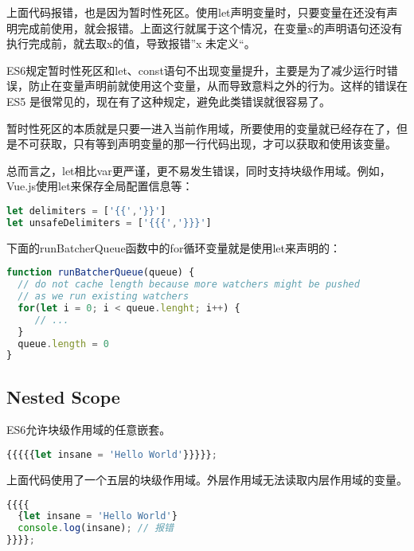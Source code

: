 上面代码报错，也是因为暂时性死区。使用let声明变量时，只要变量在还没有声明完成前使用，就会报错。上面这行就属于这个情况，在变量x的声明语句还没有执行完成前，就去取x的值，导致报错”x 未定义“。

ES6规定暂时性死区和let、const语句不出现变量提升，主要是为了减少运行时错误，防止在变量声明前就使用这个变量，从而导致意料之外的行为。这样的错误在 ES5 是很常见的，现在有了这种规定，避免此类错误就很容易了。

暂时性死区的本质就是只要一进入当前作用域，所要使用的变量就已经存在了，但是不可获取，只有等到声明变量的那一行代码出现，才可以获取和使用该变量。

总而言之，let相比var更严谨，更不易发生错误，同时支持块级作用域。例如，Vue.js使用let来保存全局配置信息等：






\begin{lstlisting}[language=JavaScript]
let delimiters = ['{{','}}']
let unsafeDelimiters = ['{{{','}}}']
\end{lstlisting}

下面的runBatcherQueue函数中的for循环变量就是使用let来声明的：






\begin{lstlisting}[language=JavaScript]
function runBatcherQueue(queue) {
  // do not cache length because more watchers might be pushed
  // as we run existing watchers
  for(let i = 0; i < queue.lenght; i++) {
     // ...
  }
  queue.length = 0
}
\end{lstlisting}


\subsection{Nested Scope}

ES6允许块级作用域的任意嵌套。


\begin{lstlisting}[language=JavaScript]
{{{{{let insane = 'Hello World'}}}}};
\end{lstlisting}

上面代码使用了一个五层的块级作用域。外层作用域无法读取内层作用域的变量。



\begin{lstlisting}[language=JavaScript]
{{{{
  {let insane = 'Hello World'}
  console.log(insane); // 报错
}}}};
\end{lstlisting}

